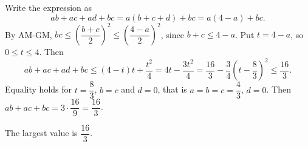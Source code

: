 Write the expression as
\[ab+ac+ad+bc=a(b+c+d)+bc=a(4-a)+bc.\]
By AM-GM, $bc\le\left(\dfrac{b+c}2\right)^2\le\left(\dfrac{4-a}2\right)^2$, since $b+c\le4-a$. Put $t=4-a$, so $0\le t\le4$. Then
\[ab+ac+ad+bc\le(4-t)t+\dfrac{t^2}4=4t-\dfrac{3t^2}4=\dfrac{16}3-\dfrac34\left(t-\dfrac83\right)^2\le\dfrac{16}3.\]
Equality holds for $t=\dfrac83$, $b=c$ and $d=0$, that is $a=b=c=\dfrac43$, $d=0$. Then $ab+ac+bc=3\cdot\dfrac{16}9=\dfrac{16}3$.

The largest value is $\boxed{\dfrac{16}{3}}$.
